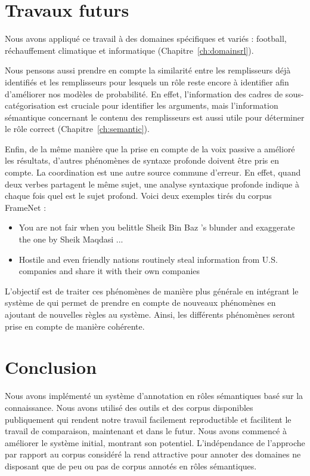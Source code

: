 \section{Travaux futurs}

Nous avons appliqué ce travail à des domaines spécifiques et variés : football,
réchauffement climatique et informatique (Chapitre~\ref{ch:domainsrl}).

Nous pensons aussi prendre en compte la similarité entre les remplisseurs déjà
identifiés et les remplisseurs pour lesquels un rôle reste encore à identifier
afin d'améliorer nos modèles de probabilité. En effet, l'information des cadres
de sous-catégorisation est cruciale pour identifier les arguments, mais
l'information sémantique concernant le contenu des remplisseurs est aussi utile
pour déterminer le rôle correct (Chapitre~\ref{ch:semantic}).

Enfin, de la même manière que la prise en compte de la voix passive a amélioré
les résultats, d'autres phénomènes de syntaxe profonde doivent être pris en
compte. La coordination est une autre source commune d'erreur. En effet, quand
deux verbes partagent le même sujet, une analyse syntaxique profonde indique à
chaque fois quel est le sujet profond. Voici deux exemples tirés du corpus
FrameNet :

\begin{itemize}
    \item You are not fair when you belittle Sheik Bin Baz 's blunder and
          exaggerate the one by Sheik Maqdasi ...
    \item Hostile and even friendly nations routinely steal information from
          U.S. companies and share it with their own companies
\end{itemize}

L'objectif est de traiter ces phénomènes de manière plus générale en intégrant
le système de \cite{ribeyre2013systeme} qui permet de prendre en compte de
nouveaux phénomènes en ajoutant de nouvelles règles au système. Ainsi, les
différents phénomènes seront prise en compte de manière cohérente.

\section{Conclusion}

Nous avons implémenté un système d'annotation en rôles sémantiques basé sur la
connaissance. Nous avons utilisé des outils et des corpus disponibles
publiquement qui rendent notre travail facilement reproductible et facilitent
le travail de comparaison, maintenant et dans le futur. Nous avons commencé à
améliorer le système initial, montrant son potentiel. L'indépendance de
l'approche par rapport au corpus considéré la rend attractive pour annoter des
domaines ne disposant que de peu ou pas de corpus annotés en rôles sémantiques.
